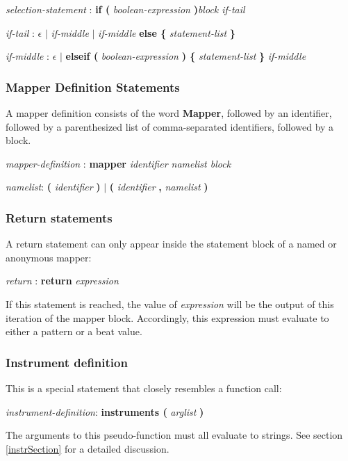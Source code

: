 \emph{selection-statement} : \textbf{if ( } \emph{boolean-expression} \textbf{ )}\emph{block if-tail}

\emph{if-tail} : $\epsilon$ $|$ \emph{if-middle} $|$
	\emph{if-middle} \textbf{else \{} \emph{statement-list} \textbf{\}} 

\emph{if-middle} : $\epsilon$ $|$   \textbf{elseif ( } \emph{boolean-expression} \textbf{ ) \{} \emph{statement-list} \textbf{\}} \emph{if-middle} 

\subsubsection{Mapper Definition Statements}\label{MapperDefinitionStatement}

A mapper definition consists of the word \textbf{Mapper}, followed by an identifier, followed by a parenthesized list of comma-separated identifiers, followed by a block.

\emph{mapper-definition} : \textbf{mapper} \emph{identifier namelist block} 

\emph{namelist}: \textbf ( \emph{identifier} \textbf ) $|$  \textbf ( \emph{identifier} 
\textbf{,} \emph{namelist} \textbf )

\subsubsection{Return statements}

A return statement can only appear inside the statement block of a named or anonymous mapper:

\emph{return} : \textbf{return} \emph{expression}

If this statement is reached, the value of  \emph{expression} will be the output of this iteration of the mapper block.  Accordingly, this expression must evaluate to either a pattern or a beat value.

\subsubsection{Instrument definition}

This is a special statement that closely resembles a function call:

\emph{instrument-definition}: \textbf{instruments (} \emph{arglist} \textbf{)}

The arguments to this pseudo-function must all evaluate to strings.  See section \ref{instrSection} for 
a detailed discussion.

